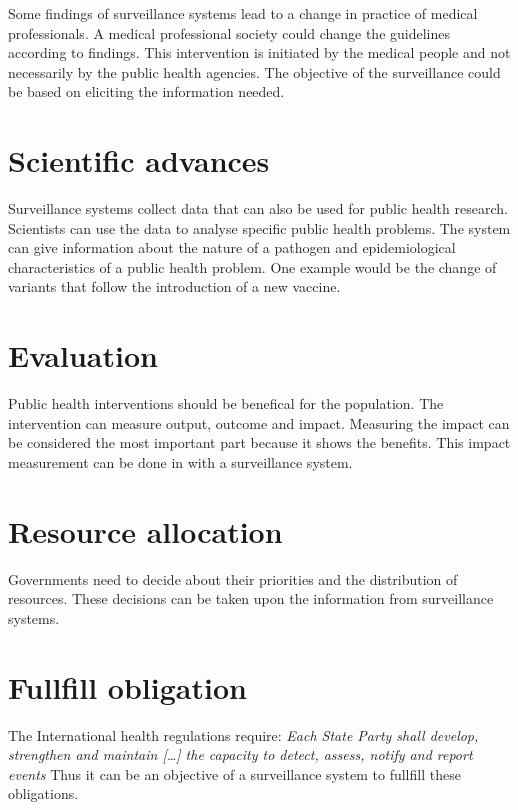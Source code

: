\documentclass[
  letterpaper,
  DIV=11,
  numbers=noendperiod]{scrreprt}
\begin{document}
Some findings of surveillance systems lead to a change in practice of
medical professionals. A medical professional society could change the
guidelines according to findings. This intervention is initiated by the
medical people and not necessarily by the public health agencies. The
objective of the surveillance could be based on eliciting the
information needed.

\section{Scientific advances}\label{scientific-advances}

Surveillance systems collect data that can also be used for public
health research. Scientists can use the data to analyse specific public
health problems. The system can give information about the nature of a
pathogen and epidemiological characteristics of a public health problem.
One example would be the change of variants that follow the introduction
of a new vaccine.

\section{Evaluation}\label{evaluation}

Public health interventions should be benefical for the population. The
intervention can measure output, outcome and impact. Measuring the
impact can be considered the most important part because it shows the
benefits. This impact measurement can be done in with a surveillance
system.

\section{Resource allocation}\label{resource-allocation}

Governments need to decide about their priorities and the distribution
of resources. These decisions can be taken upon the information from
surveillance systems.

\section{Fullfill obligation}\label{fullfill-obligation}

The International health regulations require: \emph{Each State Party
shall develop, strengthen and maintain {[}\ldots{]} the capacity to
detect, assess, notify and report events} Thus it can be an objective of
a surveillance system to fullfill these obligations.
\end{document}
